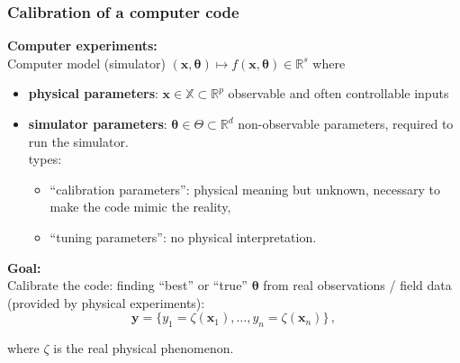 \documentclass[nopagenumber,9pt]{beamer}
\newcommand{\btheta}{\boldsymbol{\theta}}
\newcommand{\by}{\mathbf{y}}
\newcommand{\bx}{\mathbf{x}}
\begin{document}
\begin{frame}
\frametitle{Calibration of a computer code} 
 \textbf{Computer experiments:}
 \\
 \medskip
Computer model (simulator)  $(\bx,\btheta)\mapsto f(\bx,\btheta)\in \mathbb{R}^s $ where\\
\medskip
\begin{itemize}
  \item \textbf{physical parameters}: $\bx\in  \mathbb{X}\subset\mathbb{R}^p$ observable and often controllable inputs
  \medskip
  \item \textbf{simulator parameters}: $\btheta\in \Theta\subset\mathbb{R}^d$ non-observable parameters, required to run the simulator.
  \\
   types:
  \begin{itemize}
   \item ``calibration parameters'': physical meaning but unknown, necessary to make the code mimic the reality,  
   \item ``tuning parameters'': no physical interpretation.
  \end{itemize}
\end{itemize}

  \bigskip
  
  \textbf{Goal:}\\
  Calibrate the code: finding ``best'' or ``true'' $\btheta$ from real observations / field data 
  (provided by physical experiments):
  $$\by=\{y_1=\zeta(\bx_1),\ldots,y_n=\zeta(\bx_n)\}\,,$$  

  where $\zeta$ is the real physical phenomenon.
  
  \end{frame}
\end{document}
